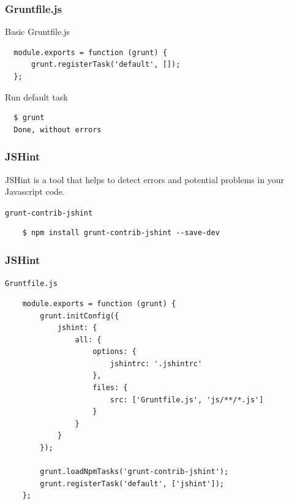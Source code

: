 \begin{frame}[fragile]
  \frametitle{Gruntfile.js}

  \begin{block}{Basic Gruntfile.js}
  {\scriptsize
  \begin{verbatim}
  module.exports = function (grunt) {  
      grunt.registerTask('default', []);
  };
  \end{verbatim}
  }
  \end{block}

  \pause

  \begin{block}{Run default task}
  {\scriptsize
  \begin{verbatim}
  $ grunt
  Done, without errors
  \end{verbatim}
  }
  \end{block}
\end{frame}

\begin{frame}[fragile]
  \frametitle{JSHint}

  JSHint is a tool that helps to detect errors and potential problems in your Javascript code.

  \pause

  \begin{block}{\texttt{grunt-contrib-jshint}}
    {\tiny
    \begin{verbatim}
    $ npm install grunt-contrib-jshint --save-dev
    \end{verbatim}
    }
  \end{block}
\end{frame}

\begin{frame}[fragile]
  \frametitle{JSHint}

  \begin{block}{\texttt{Gruntfile.js}}
    {\tiny
    \begin{verbatim}
    module.exports = function (grunt) {
        grunt.initConfig({
            jshint: {
                all: {
                    options: {
                        jshintrc: '.jshintrc'                                               
                    },
                    files: {
                        src: ['Gruntfile.js', 'js/**/*.js']
                    }
                }
            }
        });

        grunt.loadNpmTasks('grunt-contrib-jshint');
        grunt.registerTask('default', ['jshint']);
    };
    \end{verbatim}
    }
  \end{block}
\end{frame}

